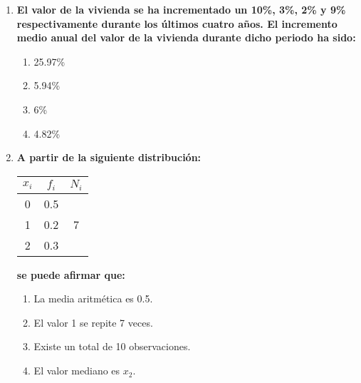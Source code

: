 \documentclass[fleqn]{article}
\begin{document}
\begin{enumerate}
\begin{enumerate}
                                \item \textbf{El valor de la vivienda se ha incrementado un 10\%, 3\%, 2\% y 9\% respectivamente durante los últimos 
                                        cuatro años. El incremento medio anual del valor de la vivienda durante dicho periodo ha sido:}
                                        \begin{enumerate}
                                                \item 25.97\%
                                                \item 5.94\%
                                                \item 6\%
                                                \item 4.82\%
                                        \end{enumerate}

                                \item \textbf{A partir de la siguiente distribución:}
                                        \begin{center}
                                                \begin{tabular}{c|c|c}
                                                        $x_i$ & $f_i$ & $N_i$ \\
                                                        \hline
                                                        0 & 0.5 & \\
                                                        \hline
                                                        1 & 0.2 & 7 \\
                                                        \hline
                                                        2 & 0.3 & \\
                                                \end{tabular}
                                        \end{center}
                                        \textbf{se puede afirmar que:}
                                        \begin{enumerate}
                                                \item La media aritmética es 0.5.
                                                \item El valor 1 se repite 7 veces.
                                                \item Existe un total de 10 observaciones.
                                                \item El valor mediano es $x_2$.
                                        \end{enumerate}
                        \end{enumerate}



\end{enumerate}
\end{document}
